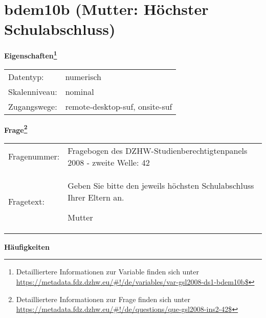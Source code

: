 
    \setcounter{footnote}{0}

    \vspace*{-1.8cm}
	\section{bdem10b (Mutter: Höchster Schulabschluss)}
	\label{section:bdem10b}



    \vspace*{0.5cm}
    \noindent\textbf{Eigenschaften\footnote{Detailliertere Informationen zur Variable finden sich unter
		\url{https://metadata.fdz.dzhw.eu/\#!/de/variables/var-gsl2008-ds1-bdem10b$}}}\\
	\begin{tabularx}{\hsize}{@{}lX}
	Datentyp: & numerisch \\
	Skalenniveau: & nominal \\
	Zugangswege: &
	  remote-desktop-suf, 
	  onsite-suf
 \\
    \end{tabularx}



				\vspace*{0.5cm}
                \noindent\textbf{Frage\footnote{Detailliertere Informationen zur Frage finden sich unter
		              \url{https://metadata.fdz.dzhw.eu/\#!/de/questions/que-gsl2008-ins2-42$}}}\\
				\begin{tabularx}{\hsize}{@{}lX}
					Fragenummer: &
					  Fragebogen des DZHW-Studienberechtigtenpanels 2008 - zweite Welle:
					  42
 \\
					Fragetext: & Geben Sie bitte den jeweils höchsten Schulabschluss Ihrer Eltern an.\par  Mutter \\
				\end{tabularx}





        		\vspace*{0.5cm}
                \noindent\textbf{Häufigkeiten}

